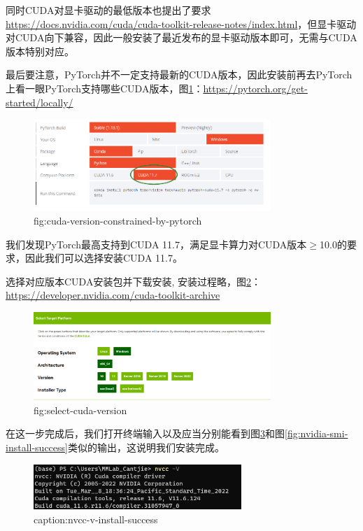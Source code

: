 同时CUDA对显卡驱动的最低版本也提出了要求\url{https://docs.nvidia.com/cuda/cuda-toolkit-release-notes/index.html}，但显卡驱动对CUDA向下兼容，因此一般安装了最近发布的显卡驱动版本即可，无需与CUDA版本特别对应。




最后要注意，PyTorch并不一定支持最新的CUDA版本，因此安装前再去PyTorch上看一眼PyTorch支持哪些CUDA版本，图\ref{fig:cuda-version-constrained-by-pytorch}：\url{https://pytorch.org/get-started/locally/}
\begin{figure}[htbp]
    \centering
    \includegraphics[width=0.8\textwidth]{figures/cuda-version-constrained-by-pytorch.png}
    \caption{fig:cuda-version-constrained-by-pytorch}
    \label{fig:cuda-version-constrained-by-pytorch}
\end{figure}

我们发现PyTorch最高支持到CUDA 11.7，满足显卡算力对CUDA版本$\geq$10.0的要求，因此我们可以选择安装CUDA 11.7。

选择对应版本CUDA安装包并下载安装, 安装过程略，图\ref{fig:select-cuda-version}：
\url{https://developer.nvidia.com/cuda-toolkit-archive}

\begin{figure}[htbp]
	\centering
	\includegraphics[width=0.8\textwidth]{figures/select-cuda-version.png}
	\caption{fig:select-cuda-version}
	\label{fig:select-cuda-version}
\end{figure}

在这一步完成后，我们打开终端输入以及应当分别能看到图\ref{fig:nvcc-v-install-success}和图\ref{fig:nvidia-smi-install-success}类似的输出，这说明我们安装完成。

\begin{figure}[htbp]
	\centering
	\includegraphics[width=0.7\textwidth]{figures/nvcc-v-install-success.png}
	\caption{caption:nvcc-v-install-success}
	\label{fig:nvcc-v-install-success}
\end{figure}

